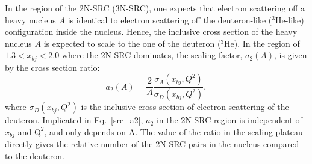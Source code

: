  In the region of the 2N-SRC (3N-SRC), one expects that electron scattering off a heavy nucleus $A$ is identical to electron scattering off the deuteron-like ($\mathrm{^{3}He}$-like) configuration inside the nucleus. Hence, the inclusive cross section of the heavy nucleus $A$ is expected to scale to the one of the deuteron ($\mathrm{^{3}He}$). In the region of $1.3<x_{bj}<2.0$ where the 2N-SRC dominates, the scaling factor, $a_{2}(A)$, is given by the cross section ratio:
\begin{equation}
  a_{2}(A) = \frac{2}{A}\frac{\sigma_{A}(x_{bj},Q^{2})}{\sigma_{D}(x_{bj},Q^{2})},
  \label{src_a2}
\end{equation}
where $\sigma_{D}(x_{bj},Q^{2})$ is the inclusive cross section of electron scattering of the deuteron. Implicated in Eq.~\ref{src_a2}, $a_{2}$ in the 2N-SRC region is independent of $x_{bj}$ and $\mathrm{Q^{2}}$, and only depends on A. The value of the ratio in the scaling plateau directly gives the relative number of the 2N-SRC pairs in the nucleus compared to the deuteron.


